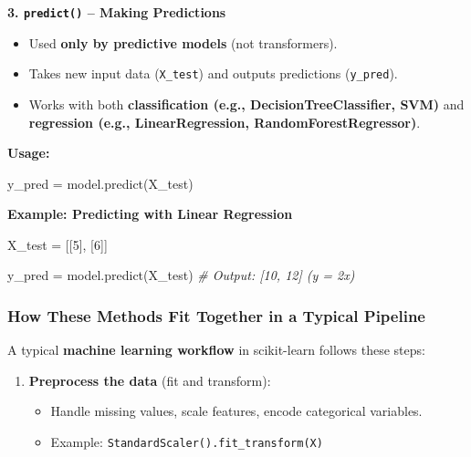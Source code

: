 \documentclass{article}
\providecommand{\tightlist}{%
      \setlength{\itemsep}{0pt}\setlength{\parskip}{0pt}}
\newenvironment{Shaded}{}{}
\newcommand{\DecValTok}[1]{\textcolor[rgb]{0.25,0.63,0.44}{{#1}}}
\newcommand{\CommentTok}[1]{\textcolor[rgb]{0.38,0.63,0.69}{\textit{{#1}}}}
\newcommand{\NormalTok}[1]{{#1}}
\newcommand{\OperatorTok}[1]{\textcolor[rgb]{0.40,0.40,0.40}{{#1}}}
\begin{document}
\textbf{3. \texttt{predict()} -- Making Predictions}

\begin{itemize}
\tightlist
\item
  Used \textbf{only by predictive models} (not transformers).
\item
  Takes new input data (\texttt{X\_test}) and outputs predictions
  (\texttt{y\_pred}).
\item
  Works with both \textbf{classification (e.g., DecisionTreeClassifier,
  SVM)} and \textbf{regression (e.g., LinearRegression,
  RandomForestRegressor)}.
\end{itemize}

\textbf{Usage:}

\begin{Shaded}
\begin{Highlighting}[]
\NormalTok{y\_pred }\OperatorTok{=}\NormalTok{ model.predict(X\_test)}
\end{Highlighting}
\end{Shaded}

\textbf{Example: Predicting with Linear Regression}

\begin{Shaded}
\begin{Highlighting}[]
\NormalTok{X\_test }\OperatorTok{=}\NormalTok{ [[}\DecValTok{5}\NormalTok{], [}\DecValTok{6}\NormalTok{]]}

\NormalTok{y\_pred }\OperatorTok{=}\NormalTok{ model.predict(X\_test)  }\CommentTok{\# Output: [10, 12] (y = 2x)}
\end{Highlighting}
\end{Shaded}

\subsubsection{How These Methods Fit Together in a Typical
Pipeline}\label{how-these-methods-fit-together-in-a-typical-pipeline}

A typical \textbf{machine learning workflow} in scikit-learn follows
these steps:

\begin{enumerate}
\def\labelenumi{\arabic{enumi}.}
\tightlist
\item
  \textbf{Preprocess the data} (fit and transform):

  \begin{itemize}
  \tightlist
  \item
    Handle missing values, scale features, encode categorical variables.
  \item
    Example: \texttt{StandardScaler().fit\_transform(X)}
  \end{itemize}
\end{enumerate}
\end{document}
